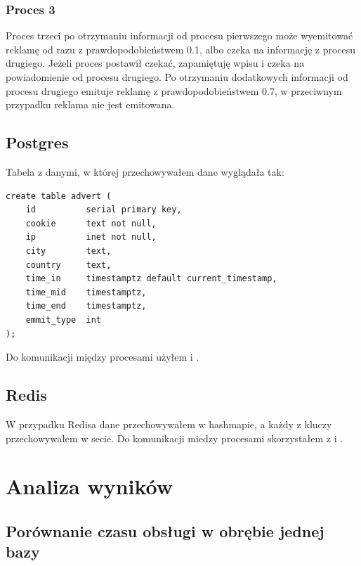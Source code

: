 \documentclass[10pt]{article}
\begin{document}
\subsubsection*{Proces 3}
Proces trzeci po otrzymaniu informacji od procesu pierwszego może wyemitować reklamę od razu z prawdopodobieństwem 0.1, albo czeka na informację z procesu drugiego. Jeżeli proces postawił czekać, zapamiętuję  wpisu i czeka na powiadomienie od procesu drugiego. Po otrzymaniu dodatkowych informacji od procesu drugiego emituje reklamę z prawdopodobieństwem 0.7, w przeciwnym przypadku reklama nie jest emitowana.

\subsection*{Postgres}

Tabela z danymi, w której przechowywałem dane wyglądała tak:
\begin{commandline}
    \begin{verbatim}
create table advert (
    id          serial primary key,
    cookie      text not null,
    ip          inet not null,
    city        text,
    country     text,
    time_in     timestamptz default current_timestamp,
    time_mid    timestamptz,
    time_end    timestamptz,
    emmit_type  int
);
\end{verbatim}
\end{commandline}

Do komunikacji między procesami użyłem  i .

\subsection*{Redis}
W przypadku Redisa dane przechowywałem w hashmapie, a każdy z kluczy przechowywałem w secie. Do komunikacji miedzy procesami skorzystałem z  i .

\section*{Analiza wyników}

\subsection*{Porównanie czasu obsługi w obrębie jednej bazy}
\end{document}
